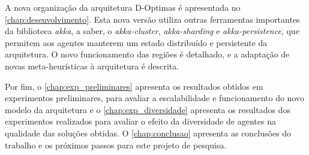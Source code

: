 A nova organização da arquitetura D-Optimas é apresentada no \autoref{chap:desenvolvimento}. Esta nova versão utiliza outras ferramentas importantes da biblioteca \textit{akka}, a saber, o \textit{akka-cluster}, \textit{akka-sharding} e \textit{akka-persistence}, que permitem aos agentes manterem um estado distribuído e persistente da arquitetura. O novo funcionamento das regiões é detalhado, e a adaptação de novas meta-heurísticas à arquitetura é descrita.

Por fim, o \autoref{chap:exp_preliminares} apresenta os resultados obtidos em experimentos preliminares, para avaliar a escalabilidade e funcionamento do novo modelo da arquitetura e o \autoref{chap:exp_diversidade} apresenta os resultados dos experimentos realizados para avaliar o efeito da diversidade de agentes na qualidade das soluções obtidas. O \autoref{chap:conclusao} apresenta as conclusões do trabalho e os próximos passos para este projeto de pesquisa. 